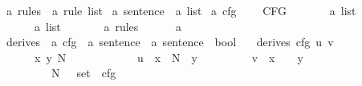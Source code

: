 \begin{isabellebody}
\ {\isacharprime}{\kern0pt}a\ rules\ {\isacharequal}{\kern0pt}\ {\isachardoublequoteopen}{\isacharprime}{\kern0pt}a\ rule\ list{\isachardoublequoteclose}\isanewline
{}\isamarkupfalse%
\ {\isacharprime}{\kern0pt}a\ sentence\ {\isacharequal}{\kern0pt}\ {\isachardoublequoteopen}{\isacharprime}{\kern0pt}a\ list{\isachardoublequoteclose}\isanewline
\isanewline
{}\isamarkupfalse%
\ {\isacharprime}{\kern0pt}a\ cfg\ {\isacharequal}{\kern0pt}\ \isanewline
\ \ CFG\ \isanewline
\ \ \ \ {\isacharparenleft}{\kern0pt}{\isasymNN}\ {\isacharcolon}{\kern0pt}\ {\isachardoublequoteopen}{\isacharprime}{\kern0pt}a\ list{\isachardoublequoteclose}{\isacharparenright}{\kern0pt}\ \isanewline
\ \ \ \ {\isacharparenleft}{\kern0pt}{\isasymTT}\ {\isacharcolon}{\kern0pt}\ {\isachardoublequoteopen}{\isacharprime}{\kern0pt}a\ list{\isachardoublequoteclose}{\isacharparenright}{\kern0pt}\ \isanewline
\ \ \ \ {\isacharparenleft}{\kern0pt}{\isasymRR}\ {\isacharcolon}{\kern0pt}\ {\isachardoublequoteopen}{\isacharprime}{\kern0pt}a\ rules{\isachardoublequoteclose}{\isacharparenright}{\kern0pt}\isanewline
\ \ \ \ {\isacharparenleft}{\kern0pt}{\isasymSS}\ {\isacharcolon}{\kern0pt}\ {\isachardoublequoteopen}{\isacharprime}{\kern0pt}a{\isachardoublequoteclose}{\isacharparenright}{\kern0pt}\isanewline
\isanewline
{}\isamarkupfalse%
\ derives{}\ {\isacharcolon}{\kern0pt}{\isacharcolon}{\kern0pt}\ {\isachardoublequoteopen}{\isacharprime}{\kern0pt}a\ cfg\ {\isasymRightarrow}\ {\isacharprime}{\kern0pt}a\ sentence\ {\isasymRightarrow}\ {\isacharprime}{\kern0pt}a\ sentence\ {\isasymRightarrow}\ bool{\isachardoublequoteclose}\ \isanewline
\ \ {\isachardoublequoteopen}derives{}\ cfg\ u\ v\ {\isacharequal}{\kern0pt}\ \isanewline
\ \ \ \ \ {\isacharparenleft}{\kern0pt}{\isasymexists}\ x\ y\ N\ {\isasymalpha}{\isachardot}{\kern0pt}\ \isanewline
\ \ \ \ \ \ \ \ \ \ u\ {\isacharequal}{\kern0pt}\ x\ {\isacharat}{\kern0pt}\ {\isacharbrackleft}{\kern0pt}N{\isacharbrackright}{\kern0pt}\ {\isacharat}{\kern0pt}\ y\isanewline
\ \ \ \ \ \ \ \ {\isasymand}\ v\ {\isacharequal}{\kern0pt}\ x\ {\isacharat}{\kern0pt}\ {\isasymalpha}\ {\isacharat}{\kern0pt}\ y\isanewline
\ \ \ \ \ \ \ \ {\isasymand}\ {\isacharparenleft}{\kern0pt}N{\isacharcomma}{\kern0pt}\ {\isasymalpha}{\isacharparenright}{\kern0pt}\ {\isasymin}\ set\ {\isacharparenleft}{\kern0pt}{\isasymRR}\ cfg{\isacharparenright}{\kern0pt}{\isacharparenright}{\kern0pt}{\isachardoublequoteclose}\ \ \isanewline
\isanewline
{}\isamarkupfalse%

\end{isabellebody}
